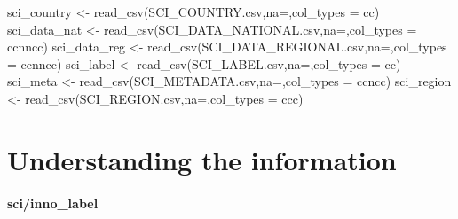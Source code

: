 \documentclass[
]{article}
\newenvironment{Shaded}{\begin{snugshade}}{\end{snugshade}}
\newcommand{\AttributeTok}[1]{\textcolor[rgb]{0.77,0.63,0.00}{#1}}
\newcommand{\FunctionTok}[1]{\textcolor[rgb]{0.00,0.00,0.00}{#1}}
\newcommand{\NormalTok}[1]{#1}
\newcommand{\OtherTok}[1]{\textcolor[rgb]{0.56,0.35,0.01}{#1}}
\newcommand{\StringTok}[1]{\textcolor[rgb]{0.31,0.60,0.02}{#1}}
\begin{document}
\begin{Shaded}
\begin{Highlighting}[]
\NormalTok{sci\_country }\OtherTok{\textless{}{-}} \FunctionTok{read\_csv}\NormalTok{(}\StringTok{\textquotesingle{}SCI\_COUNTRY.csv\textquotesingle{}}\NormalTok{,}\AttributeTok{na=}\StringTok{\textquotesingle{}\textquotesingle{}}\NormalTok{,}\AttributeTok{col\_types =} \StringTok{\textquotesingle{}cc\textquotesingle{}}\NormalTok{)}
\NormalTok{sci\_data\_nat }\OtherTok{\textless{}{-}} \FunctionTok{read\_csv}\NormalTok{(}\StringTok{\textquotesingle{}SCI\_DATA\_NATIONAL.csv\textquotesingle{}}\NormalTok{,}\AttributeTok{na=}\StringTok{\textquotesingle{}\textquotesingle{}}\NormalTok{,}\AttributeTok{col\_types =} \StringTok{\textquotesingle{}ccnncc\textquotesingle{}}\NormalTok{)}
\NormalTok{sci\_data\_reg }\OtherTok{\textless{}{-}} \FunctionTok{read\_csv}\NormalTok{(}\StringTok{\textquotesingle{}SCI\_DATA\_REGIONAL.csv\textquotesingle{}}\NormalTok{,}\AttributeTok{na=}\StringTok{\textquotesingle{}\textquotesingle{}}\NormalTok{,}\AttributeTok{col\_types =} \StringTok{\textquotesingle{}ccnncc\textquotesingle{}}\NormalTok{)}
\NormalTok{sci\_label }\OtherTok{\textless{}{-}} \FunctionTok{read\_csv}\NormalTok{(}\StringTok{\textquotesingle{}SCI\_LABEL.csv\textquotesingle{}}\NormalTok{,}\AttributeTok{na=}\StringTok{\textquotesingle{}\textquotesingle{}}\NormalTok{,}\AttributeTok{col\_types =} \StringTok{\textquotesingle{}cc\textquotesingle{}}\NormalTok{)}
\NormalTok{sci\_meta }\OtherTok{\textless{}{-}} \FunctionTok{read\_csv}\NormalTok{(}\StringTok{\textquotesingle{}SCI\_METADATA.csv\textquotesingle{}}\NormalTok{,}\AttributeTok{na=}\StringTok{\textquotesingle{}\textquotesingle{}}\NormalTok{,}\AttributeTok{col\_types =} \StringTok{\textquotesingle{}ccncc\textquotesingle{}}\NormalTok{)}
\NormalTok{sci\_region }\OtherTok{\textless{}{-}} \FunctionTok{read\_csv}\NormalTok{(}\StringTok{\textquotesingle{}SCI\_REGION.csv\textquotesingle{}}\NormalTok{,}\AttributeTok{na=}\StringTok{\textquotesingle{}\textquotesingle{}}\NormalTok{,}\AttributeTok{col\_types =} \StringTok{\textquotesingle{}ccc\textquotesingle{}}\NormalTok{)}
\end{Highlighting}
\end{Shaded}

\hypertarget{understanding-the-information}{%
\section{Understanding the
information}\label{understanding-the-information}}

\hypertarget{sciinno_label}{%
\paragraph{sci/inno\_label}\label{sciinno_label}}
\end{document}
